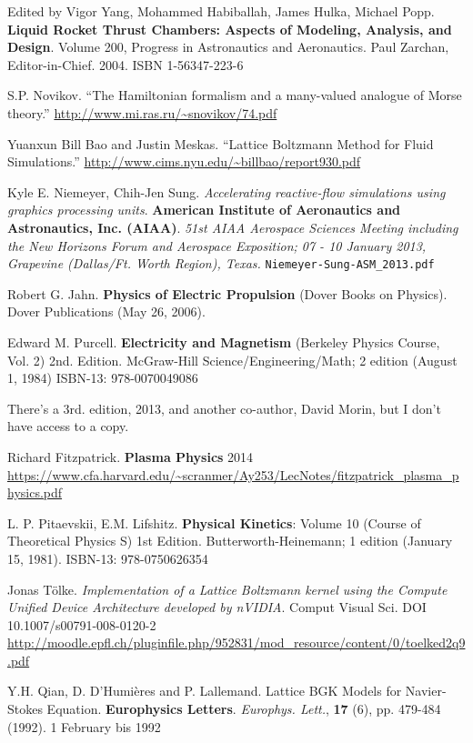 \documentclass[10pt]{amsart}
\begin{document}
\begin{thebibliography}{9}
Edited by Vigor Yang, Mohammed Habiballah, James Hulka, Michael Popp.  \textbf{Liquid Rocket Thrust Chambers: Aspects of Modeling, Analysis, and Design}.  Volume 200, Progress in Astronautics and Aeronautics.  Paul Zarchan, Editor-in-Chief. 2004.  ISBN 1-56347-223-6

S.P. Novikov. ``The Hamiltonian formalism and a many-valued analogue of Morse theory.'' \url{http://www.mi.ras.ru/~snovikov/74.pdf}

Yuanxun Bill Bao and Justin Meskas.  ``Lattice Boltzmann Method for Fluid Simulations.''   \url{http://www.cims.nyu.edu/~billbao/report930.pdf}


Kyle E. Niemeyer, Chih-Jen Sung.  \emph{Accelerating reactive-flow simulations using graphics processing units}.  \textbf{American Institute of Aeronautics and Astronautics, Inc. (AIAA)}.  \emph{51st AIAA Aerospace Sciences Meeting including the New Horizons Forum and Aerospace Exposition; 07 - 10 January 2013, Grapevine (Dallas/Ft. Worth Region), Texas. }  \verb|Niemeyer-Sung-ASM_2013.pdf|
  

Robert G. Jahn. \textbf{Physics of Electric Propulsion} (Dover Books on Physics).  Dover Publications (May 26, 2006). 

  Edward M. Purcell. \textbf{Electricity and Magnetism} (Berkeley Physics Course, Vol. 2) 2nd. Edition.  McGraw-Hill Science/Engineering/Math; 2 edition (August 1, 1984) ISBN-13: 978-0070049086

  There's a 3rd. edition, 2013, and another co-author, David Morin, but I don't have access to a copy.  

Richard Fitzpatrick. \textbf{Plasma Physics} 2014  \url{https://www.cfa.harvard.edu/~scranmer/Ay253/LecNotes/fitzpatrick_plasma_physics.pdf}

L. P. Pitaevskii, E.M. Lifshitz. \textbf{Physical Kinetics}: Volume 10 (Course of Theoretical Physics S) 1st Edition.  Butterworth-Heinemann; 1 edition (January 15, 1981).  ISBN-13: 978-0750626354

  Jonas T\"{o}lke.  \emph{Implementation of a Lattice Boltzmann kernel using the Compute Unified Device Architecture developed by nVIDIA}.  Comput Visual Sci.  DOI 10.1007/s00791-008-0120-2  \url{http://moodle.epfl.ch/pluginfile.php/952831/mod_resource/content/0/toelked2q9.pdf}

Y.H. Qian, D. D'Humi\`{e}res and P. Lallemand.  Lattice BGK Models for Navier-Stokes Equation.  \textbf{Europhysics Letters}.  \emph{Europhys. Lett.}, \textbf{17} (6), pp. 479-484 (1992).  1 February bis 1992 
 


\end{thebibliography}
\end{document}
